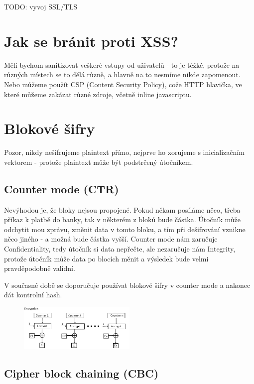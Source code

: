 TODO: vyvoj SSL/TLS


\section{Jak se bránit proti XSS?}

Měli bychom sanitizovat veškeré vstupy od uživatelů - to je těžké, protože na různých místech se to dělá různě, a hlavně na to nesmíme nikde zapomenout. Nebo můžeme použít CSP (Content Security Policy), cože HTTP hlavička, ve které můžeme zakázat různé zdroje, včetně inline javascriptu.


\section{Blokové šifry}

Pozor, nikdy nešifrujeme plaintext přímo, nejprve ho xorujeme s inicializačním vektorem - protože plaintext může být podstrčený útočníkem.

\subsection{Counter mode (CTR)}

Nevýhodou je, že bloky nejsou propojené. Pokud někam posíláme něco, třeba příkaz k platbě do banky, tak v některém z bloků bude částka. Útočník může odchytit mou zprávu, změnit data v tomto bloku, a tím při dešifrování vznikne něco jiného - a možná bude částka vyšší. Counter mode nám zaručuje Confidentiality, tedy útočník si data nepřečte, ale nezaručuje nám Integrity, protože útočník může data po blocích měnit a výsledek bude velmi pravděpodobně validní.

V současné době se doporučuje používat blokové šifry v counter mode a nakonec dát kontrolní hash.

\begin{figure}[ht!]
\centering
\includegraphics[width=0.5\textwidth]{KBE/img/ctr.png}
\end{figure}


\subsection{Cipher block chaining (CBC)}

